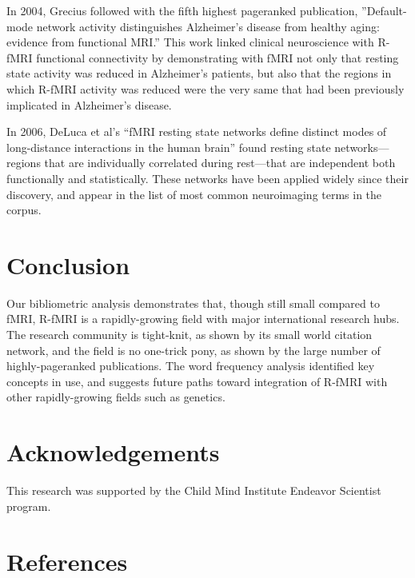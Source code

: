 \documentclass[12pt,3p,review,number]{elsarticle}
\begin{document}
In 2004, Grecius followed with the fifth highest pageranked publication,
''Default-mode network activity distinguishes Alzheimer’s disease from healthy
aging: evidence from functional MRI.'' This work linked clinical neuroscience
with R-fMRI functional connectivity by demonstrating with fMRI not only that
resting state activity was reduced in Alzheimer’s patients, but also that the
regions in which R-fMRI activity was reduced were the very same that had been
previously implicated in Alzheimer’s disease. 

In 2006, DeLuca et al’s ``fMRI resting state networks define distinct modes of
long-distance interactions in the human brain'' found resting state
networks—regions that are individually correlated during rest—that are
independent both functionally and statistically. These networks have been
applied widely since their discovery, and appear in the list of most common
neuroimaging terms in the corpus.


\section{Conclusion}

Our bibliometric analysis demonstrates that, though still small compared to
fMRI, R-fMRI is a rapidly-growing field with major international research hubs.
The research community is tight-knit, as shown by its small world citation
network, and the field is no one-trick pony, as shown by the large number of
highly-pageranked publications. The word frequency analysis identified key
concepts in use, and suggests future paths toward integration of R-fMRI with
other rapidly-growing fields such as genetics.

\section{Acknowledgements}
This research was supported by the Child Mind Institute Endeavor Scientist program.

{
\section*{References}

 
}
\end{document}
